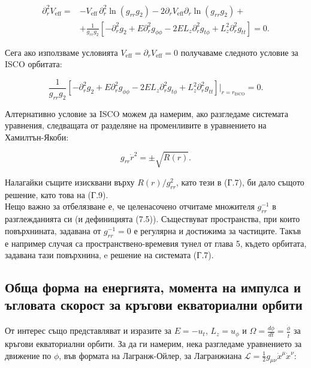 \begin{appendices}
		\begin{equation}
			\begin{aligned}
				\partial^2_r V_\text{eff} =& -V_\text{eff}\,\partial^2_r\ln(g_{rr}g_2) - 2\partial_r V_\text{eff}\partial_r\ln(g_{rr}g_2) + \\
				&+\frac{1}{g_{rr}g_2}\left[-\partial^2_rg_2 + E\partial^2_rg_{\phi\phi} - 2EL_z\partial^2_rg_{t\phi} + L_z^2\partial^2_rg_{tt}\right] = 0.
			\end{aligned}
		\end{equation}

	Сега ако използваме условията $V_\text{eff} = \partial_r V_\text{eff} = 0$ получаваме следното условие за ISCO орбитата:
	
	\begin{equation}
		\frac{1}{g_{rr}g_2}\left[-\partial^2_rg_2 + E\partial^2_rg_{\phi\phi} - 2EL_z\partial^2_rg_{t\phi} + L_z^2\partial^2_rg_{tt}\right]\bigg\vert_{r = r_\text{ISCO}} = 0.
	\end{equation}
	
	Алтернативно условие за ISCO можем да намерим, ако разгледаме системата уравнения, следващата от разделяне на променливите в уравнението на Хамилтън-Якоби:
	
	\begin{equation}
		g_{rr}\dot{r}^2 = \pm\sqrt{R(r)}.
	\end{equation}
	
	Налагайки същите изисквани върху $R(r) / g_{rr}^2$, като тези в (Г.7), би дало същото решение, като това на (Г.9).\\
	
	Нещо важно за отбелязване е, че целенасочено отчитаме множителя $g_{rr}^{-1}$ в разглежданията си (и дефиницията (7.5)). Съществуват пространства, при които повърхнината, задавана от $g_{rr}^{-1} = 0$ е регулярна и достижима за частиците. Такъв е например случая са пространствено-времевия тунел от глава 5, където орбитата, задавана тази повърхнина, e решение на системата (Г.7).\\
	
	\subsection{Обща форма на енергията, момента на импулса и ъгловата скорост за кръгови екваториални орбити}
	
	От интерес също представляват и изразите за $E = -u_t$, $L_z = u_\phi$ и $\Omega = \frac{d\phi}{dt} = \frac{\dot{\phi}}{\dot{t}}$ за кръгови екваториални орбити. За да ги намерим, нека разгледаме уравнението за движение по $\phi$, във формата на Лагранж-Ойлер, за Лагранжиана $\mathcal{L} = \frac{1}{2}g_{\mu\nu}\dot{x}^\mu\dot{x}^\nu$:
	

\end{appendices}
